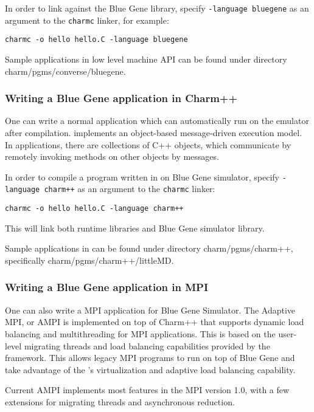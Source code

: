 In order to link against the Blue Gene library, specify 
\texttt{-language bluegene} as an argument to the {\tt charmc} linker, 
for example:
\begin{verbatim}
charmc -o hello hello.C -language bluegene
\end{verbatim}

Sample applications in low level machine API can be found under directory
charm/pgms/converse/bluegene.

\subsubsection{Writing a Blue Gene application in Charm++}

One can write a normal \charmpp{} application which can automatically 
run on the emulator after compilation. \charmpp{} implements
an object-based message-driven execution model. In \charmpp{} applications,
there are collections of C++ objects, which communicate by remotely invoking
methods on other objects by messages.

In order to compile a program written in \charmpp{} on Blue Gene simulator, 
specify \texttt{-language charm++} as an argument to the {\tt charmc} linker:
\begin{verbatim}
charmc -o hello hello.C -language charm++
\end{verbatim}
This will link both \charmpp{} runtime libraries and Blue Gene simulator 
library.

Sample applications in \charmpp{} can be found under directory
charm/pgms/charm++, specifically charm/pgms/charm++/littleMD.

\subsubsection{Writing a Blue Gene application in MPI}

One can also write a MPI application for Blue Gene Simulator.
The Adaptive MPI, or AMPI is implemented on top of Charm++ that supports
dynamic load balancing and multithreading for MPI applications. This is based
on the user-level migrating threads and load balancing capabilities provided
by the \charmpp{} framework. This allows legacy MPI programs to run 
on top of Blue Gene \charmpp{} and take advantage of the \charmpp{}'s
virtualization and adaptive load balancing capability.

Current AMPI implements most features in the MPI version 1.0, with a few
extensions for migrating threads and asynchronous reduction.

